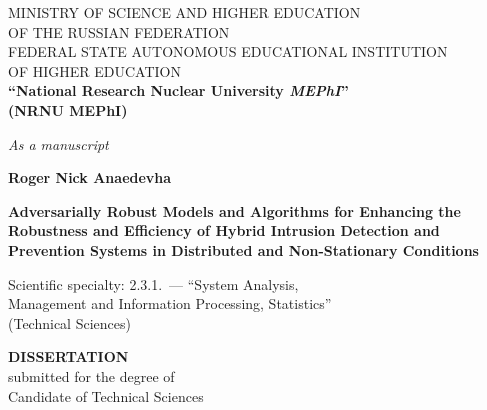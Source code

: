 
\begin{titlepage}
\thispagestyle{empty}
\begin{center}

{\small
MINISTRY OF SCIENCE AND HIGHER EDUCATION\\
OF THE RUSSIAN FEDERATION\\
FEDERAL STATE AUTONOMOUS EDUCATIONAL INSTITUTION\\
OF HIGHER EDUCATION\\[2pt]
\textbf{``National Research Nuclear University \textit{MEPhI}''}\\
\textbf{(NRNU MEPhI)}
}

\end{center}

\hfill
\begin{minipage}{0.45\textwidth}
\flushright
\itshape As a manuscript
\end{minipage}

\vspace{1.2cm}

\begin{center}

{\large\textbf{Roger Nick Anaedevha}}

\vspace{1.1cm}

{\large\textbf{Adversarially Robust Models and Algorithms for
Enhancing the Robustness and Efficiency of Hybrid Intrusion
Detection and Prevention Systems in Distributed and
Non-Stationary Conditions}}

\vspace{1.3cm}

{\small
Scientific specialty: 2.3.1.~--- ``System Analysis,\\
Management and Information Processing, Statistics''\\
(Technical Sciences)
}

\vspace{1.0cm}

\textbf{DISSERTATION}\\[2pt]
submitted for the degree of\\
Candidate of Technical Sciences


\end{center}
\end{titlepage}
